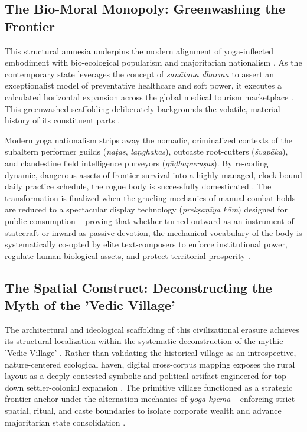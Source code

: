 \documentclass[11pt,twoside,letterpaper]{article}
\begin{document}
\subsection{The Bio-Moral Monopoly: Greenwashing the Frontier}
This structural amnesia underpins the modern alignment of yoga-inflected embodiment with bio-ecological popularism and majoritarian nationalism \citep{mccartney2021}. As the contemporary state leverages the concept of \textit{sanātana dharma} to assert an exceptionalist model of preventative healthcare and soft power, it executes a calculated horizontal expansion across the global medical tourism marketplace \citep{mccartney2021}. This greenwashed scaffolding deliberately backgrounds the volatile, material history of its constituent parts \citep{mccartney2021}.

Modern yoga nationalism strips away the nomadic, criminalized contexts of the subaltern performer guilds (\textit{naṭas}, \textit{laṇghakas}), outcaste root-cutters (\textit{śvapāka}), and clandestine field intelligence purveyors (\textit{gūḍhapuruṣas}). By re-coding dynamic, dangerous assets of frontier survival into a highly managed, clock-bound daily practice schedule, the rogue body is successfully domesticated \citep{mccartney2021}. The transformation is finalized when the grueling mechanics of manual combat holds are reduced to a spectacular display technology (\textit{prekṣaṇīya kām}) designed for public consumption – proving that whether turned outward as an instrument of statecraft or inward as passive devotion, the mechanical vocabulary of the body is systematically co-opted by elite text-composers to enforce institutional power, regulate human biological assets, and protect territorial prosperity \citep{mccartney2021}.

\subsection{The Spatial Construct: Deconstructing the Myth of the 'Vedic Village'}
The architectural and ideological scaffolding of this civilizational erasure achieves its structural localization within the systematic deconstruction of the mythic 'Vedic Village' \citep{mccartney2026}. Rather than validating the historical village as an introspective, nature-centered ecological haven, digital cross-corpus mapping exposes the rural layout as a deeply contested symbolic and political artifact engineered for top-down settler-colonial expansion \citep{mccartney2026}. The primitive village functioned as a strategic frontier anchor under the alternation mechanics of \textit{yoga-kṣema} – enforcing strict spatial, ritual, and caste boundaries to isolate corporate wealth and advance majoritarian state consolidation \citep{mccartney2026}.
\end{document}
